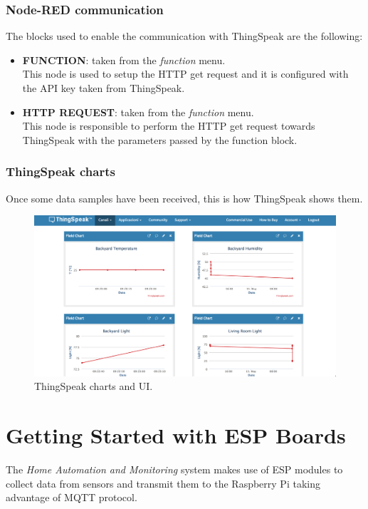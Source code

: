 \subsubsection{Node-RED communication}

The blocks used to enable the communication with ThingSpeak are the following:
\begin{itemize}
    \item \textbf{FUNCTION}: taken from the \textit{function} menu. \\
    This node is used to setup the HTTP get request and it is configured with the API key taken from ThingSpeak.
    \item \textbf{HTTP REQUEST}: taken from the \textit{function} menu. \\
    This node is responsible to perform the HTTP get request towards ThingSpeak with the parameters passed by the function block.
\end{itemize}

\subsubsection{ThingSpeak charts}
Once some data samples have been received, this is how ThingSpeak shows them.

\begin{figure}[H]
	\begin{center}
		\includegraphics[width=\textwidth]{./pictures/thingspeak-channel-charts}
		\caption{ThingSpeak charts and UI.}
		\label{thingspeak_charts}
	\end{center}
\end{figure}

\newpage
\section{Getting Started with ESP Boards}
The \textit{Home Automation and Monitoring} system makes use of ESP modules to collect data from sensors and transmit them to the Raspberry Pi taking advantage of MQTT protocol.

